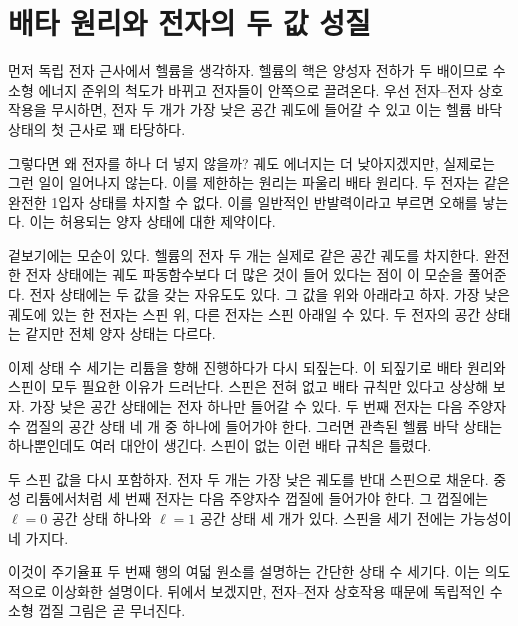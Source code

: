 \section{배타 원리와 전자의 두 값 성질}

먼저 독립 전자 근사에서 헬륨을 생각하자. 헬륨의 핵은 양성자 전하가 두 배이므로 수소형 에너지 준위의 척도가 바뀌고 전자들이 안쪽으로 끌려온다. 우선 전자--전자 상호작용을 무시하면, 전자 두 개가 가장 낮은 공간 궤도에 들어갈 수 있고 이는 헬륨 바닥 상태의 첫 근사로 꽤 타당하다.

그렇다면 왜 전자를 하나 더 넣지 않을까? 궤도 에너지는 더 낮아지겠지만, 실제로는 그런 일이 일어나지 않는다. 이를 제한하는 원리는 파울리 배타 원리다. 두 전자는 같은 완전한 1입자 상태를 차지할 수 없다. 이를 일반적인 반발력이라고 부르면 오해를 낳는다. 이는 허용되는 양자 상태에 대한 제약이다.

겉보기에는 모순이 있다. 헬륨의 전자 두 개는 실제로 같은 공간 궤도를 차지한다. 완전한 전자 상태에는 궤도 파동함수보다 더 많은 것이 들어 있다는 점이 이 모순을 풀어준다. 전자 상태에는 두 값을 갖는 자유도도 있다. 그 값을 위와 아래라고 하자. 가장 낮은 궤도에 있는 한 전자는 스핀 위, 다른 전자는 스핀 아래일 수 있다. 두 전자의 공간 상태는 같지만 전체 양자 상태는 다르다.

이제 상태 수 세기는 리튬을 향해 진행하다가 다시 되짚는다. 이 되짚기로 배타 원리와 스핀이 모두 필요한 이유가 드러난다. 스핀은 전혀 없고 배타 규칙만 있다고 상상해 보자. 가장 낮은 공간 상태에는 전자 하나만 들어갈 수 있다. 두 번째 전자는 다음 주양자수 껍질의 공간 상태 네 개 중 하나에 들어가야 한다. 그러면 관측된 헬륨 바닥 상태는 하나뿐인데도 여러 대안이 생긴다. 스핀이 없는 이런 배타 규칙은 틀렸다.

두 스핀 값을 다시 포함하자. 전자 두 개는 가장 낮은 궤도를 반대 스핀으로 채운다. 중성 리튬에서처럼 세 번째 전자는 다음 주양자수 껍질에 들어가야 한다. 그 껍질에는 \(\ell=0\) 공간 상태 하나와 \(\ell=1\) 공간 상태 세 개가 있다. 스핀을 세기 전에는 가능성이 네 가지다.

\begin{classroomqa}
\end{classroomqa}

이것이 주기율표 두 번째 행의 여덟 원소를 설명하는 간단한 상태 수 세기다. 이는 의도적으로 이상화한 설명이다. 뒤에서 보겠지만, 전자--전자 상호작용 때문에 독립적인 수소형 껍질 그림은 곧 무너진다.

